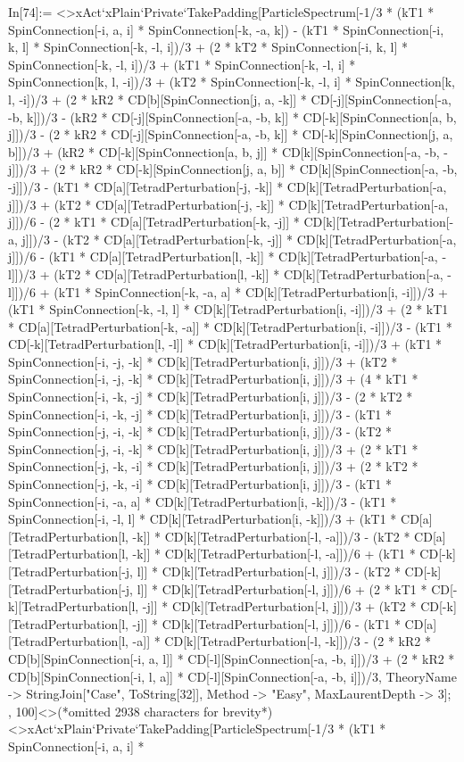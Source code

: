 In[74]:= <>xAct`xPlain`Private`TakePadding[ParticleSpectrum[-1/3 * (kT1 * SpinConnection[-i, a, i] * SpinConnection[-k, -a, k]) - (kT1 * SpinConnection[-i, k, l] * SpinConnection[-k, -l, i])/3 + (2 * kT2 * SpinConnection[-i, k, l] * SpinConnection[-k, -l, i])/3 + (kT1 * SpinConnection[-k, -l, i] * SpinConnection[k, l, -i])/3 + (kT2 * SpinConnection[-k, -l, i] * SpinConnection[k, l, -i])/3 + (2 * kR2 * CD[b][SpinConnection[j, a, -k]] * CD[-j][SpinConnection[-a, -b, k]])/3 - (kR2 * CD[-j][SpinConnection[-a, -b, k]] * CD[-k][SpinConnection[a, b, j]])/3 - (2 * kR2 * CD[-j][SpinConnection[-a, -b, k]] * CD[-k][SpinConnection[j, a, b]])/3 + (kR2 * CD[-k][SpinConnection[a, b, j]] * CD[k][SpinConnection[-a, -b, -j]])/3 + (2 * kR2 * CD[-k][SpinConnection[j, a, b]] * CD[k][SpinConnection[-a, -b, -j]])/3 - (kT1 * CD[a][TetradPerturbation[-j, -k]] * CD[k][TetradPerturbation[-a, j]])/3 + (kT2 * CD[a][TetradPerturbation[-j, -k]] * CD[k][TetradPerturbation[-a, j]])/6 - (2 * kT1 * CD[a][TetradPerturbation[-k, -j]] * CD[k][TetradPerturbation[-a, j]])/3 - (kT2 * CD[a][TetradPerturbation[-k, -j]] * CD[k][TetradPerturbation[-a, j]])/6 - (kT1 * CD[a][TetradPerturbation[l, -k]] * CD[k][TetradPerturbation[-a, -l]])/3 + (kT2 * CD[a][TetradPerturbation[l, -k]] * CD[k][TetradPerturbation[-a, -l]])/6 + (kT1 * SpinConnection[-k, -a, a] * CD[k][TetradPerturbation[i, -i]])/3 + (kT1 * SpinConnection[-k, -l, l] * CD[k][TetradPerturbation[i, -i]])/3 + (2 * kT1 * CD[a][TetradPerturbation[-k, -a]] * CD[k][TetradPerturbation[i, -i]])/3 - (kT1 * CD[-k][TetradPerturbation[l, -l]] * CD[k][TetradPerturbation[i, -i]])/3 + (kT1 * SpinConnection[-i, -j, -k] * CD[k][TetradPerturbation[i, j]])/3 + (kT2 * SpinConnection[-i, -j, -k] * CD[k][TetradPerturbation[i, j]])/3 + (4 * kT1 * SpinConnection[-i, -k, -j] * CD[k][TetradPerturbation[i, j]])/3 - (2 * kT2 * SpinConnection[-i, -k, -j] * CD[k][TetradPerturbation[i, j]])/3 - (kT1 * SpinConnection[-j, -i, -k] * CD[k][TetradPerturbation[i, j]])/3 - (kT2 * SpinConnection[-j, -i, -k] * CD[k][TetradPerturbation[i, j]])/3 + (2 * kT1 * SpinConnection[-j, -k, -i] * CD[k][TetradPerturbation[i, j]])/3 + (2 * kT2 * SpinConnection[-j, -k, -i] * CD[k][TetradPerturbation[i, j]])/3 - (kT1 * SpinConnection[-i, -a, a] * CD[k][TetradPerturbation[i, -k]])/3 - (kT1 * SpinConnection[-i, -l, l] * CD[k][TetradPerturbation[i, -k]])/3 + (kT1 * CD[a][TetradPerturbation[l, -k]] * CD[k][TetradPerturbation[-l, -a]])/3 - (kT2 * CD[a][TetradPerturbation[l, -k]] * CD[k][TetradPerturbation[-l, -a]])/6 + (kT1 * CD[-k][TetradPerturbation[-j, l]] * CD[k][TetradPerturbation[-l, j]])/3 - (kT2 * CD[-k][TetradPerturbation[-j, l]] * CD[k][TetradPerturbation[-l, j]])/6 + (2 * kT1 * CD[-k][TetradPerturbation[l, -j]] * CD[k][TetradPerturbation[-l, j]])/3 + (kT2 * CD[-k][TetradPerturbation[l, -j]] * CD[k][TetradPerturbation[-l, j]])/6 - (kT1 * CD[a][TetradPerturbation[l, -a]] * CD[k][TetradPerturbation[-l, -k]])/3 - (2 * kR2 * CD[b][SpinConnection[-i, a, l]] * CD[-l][SpinConnection[-a, -b, i]])/3 + (2 * kR2 * CD[b][SpinConnection[-i, l, a]] * CD[-l][SpinConnection[-a, -b, i]])/3, TheoryName -> StringJoin["Case", ToString[32]], Method -> "Easy", MaxLaurentDepth -> 3]; , 100]<>(*omitted 2938 characters for brevity*)<>xAct`xPlain`Private`TakePadding[ParticleSpectrum[-1/3 * (kT1 * SpinConnection[-i, a, i] * 
